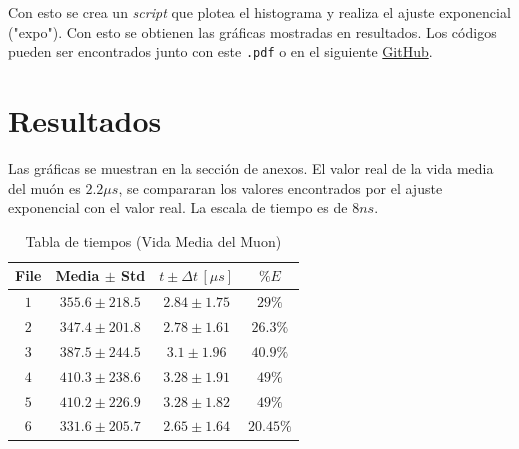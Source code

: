 \documentclass[conference]{IEEEtran}
\begin{document}
Con esto se crea un \textit{script} que plotea el histograma y realiza el ajuste exponencial ("expo"). Con esto se obtienen las gráficas mostradas en resultados. Los códigos pueden ser encontrados junto con este \texttt{.pdf} o en el siguiente \href{https://github.com/DSarceno/Semestre9/blob/master/Laboratorio\%20Avanzado/Vida_media_muon/Codigos}{GitHub}.
        
        
        
        
\section{Resultados}
    Las gráficas se muestran en la sección de anexos. El valor real de la vida media del muón es $2.2\mu s$, se compararan los valores encontrados por el ajuste exponencial con el valor real. La escala de tiempo es de $8ns$.
    \begin{table}[H]
    	\centering
    	\caption{Tabla de tiempos (Vida Media del Muon)}
		\label{table:tiempos}
		\begin{tabular}{||c||c|c|c||}
			\hline
			\hline
			File & Media $\pm$ Std   & $t\pm \Delta t\, [\mu s]$ & $\% E$      \\
			\hline
			\hline
			$1$    & $355.6 \pm 218.5$ & $2.84 \pm 1.75$         & $29\%$    \\
			$2$    & $347.4 \pm 201.8$ & $2.78\pm 1.61$          & $26.3\%$  \\
			$3$    & $387.5 \pm 244.5$ & $3.1\pm 1.96$           & $40.9\%$  \\
			$4$    & $410.3\pm 238.6$  & $3.28\pm 1.91$          & $49\%$    \\
			$5$    & $410.2\pm 226.9$  & $3.28\pm 1.82$          & $49\%$    \\
			$6$    & $331.6\pm 205.7$  & $2.65\pm 1.64$          & $20.45\%$ \\
			\hline
			\hline
		\end{tabular}
	\end{table}
    
    
    
\end{document}
